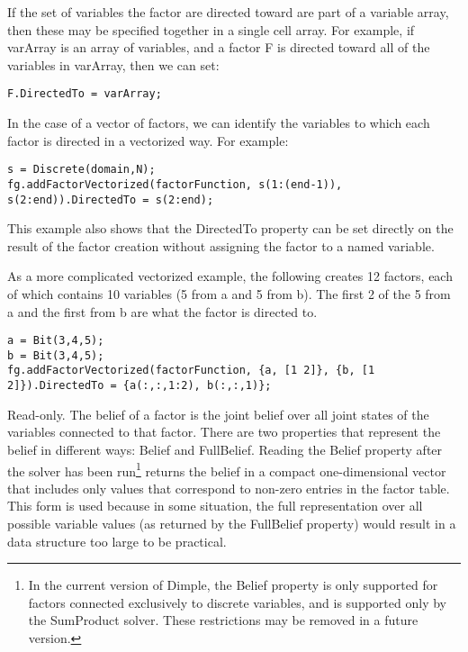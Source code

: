 If the set of variables the factor are directed toward are part of a variable array, then these may be specified together in a single cell array.  For example, if varArray is an array of variables, and a factor F is directed toward all of the variables in varArray, then we can set:

\begin{lstlisting}
F.DirectedTo = varArray;
\end{lstlisting}

In the case of a vector of factors, we can identify the variables to which each factor is directed in a vectorized way.  For example:

\begin{lstlisting}
s = Discrete(domain,N);
fg.addFactorVectorized(factorFunction, s(1:(end-1)), s(2:end)).DirectedTo = s(2:end);
\end{lstlisting}

This example also shows that the DirectedTo property can be set directly on the result of the factor creation without assigning the factor to a named variable.

As a more complicated vectorized example, the following creates 12 factors, each of which contains 10 variables (5 from a and 5 from b).  The first 2 of the 5 from a and the first from b are what the factor is directed to.

\begin{lstlisting}
a = Bit(3,4,5);
b = Bit(3,4,5);
fg.addFactorVectorized(factorFunction, {a, [1 2]}, {b, [1 2]}).DirectedTo = {a(:,:,1:2), b(:,:,1)};
\end{lstlisting}

\label{sec:Factor.Belief}

Read-only.  The belief of a factor is the joint belief over all joint states of the variables connected to that factor.  There are two properties that represent the belief in different ways: Belief and FullBelief.  Reading the Belief property after the solver has been run\footnote{In the current version of Dimple, the Belief property is only supported for factors connected exclusively to discrete variables, and is supported only by the SumProduct solver.  These restrictions may be removed in a future version.} returns the belief in a compact one-dimensional vector that includes only values that correspond to non-zero entries in the factor table.  This form is used because in some situation, the full representation over all possible variable values (as returned by the FullBelief property) would result in a data structure too large to be practical.

